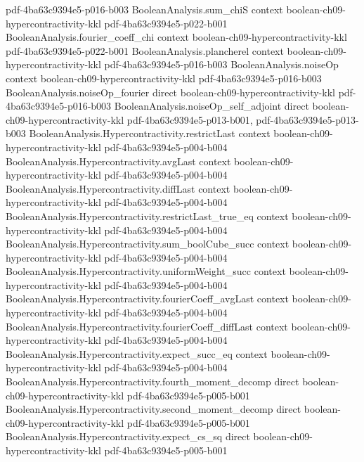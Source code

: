 \begin{theorem}[The $(4/3,2)$-hypercontractive inequality at $\rho=1/\sqrt3$]
  {pdf-4ba63c9394e5-p016-b003}
\proofstep
  {BooleanAnalysis.sum_chiS}
  {context}
  {boolean-ch09-hypercontractivity-kkl}
  {pdf-4ba63c9394e5-p022-b001}
\proofstep
  {BooleanAnalysis.fourier_coeff_chi}
  {context}
  {boolean-ch09-hypercontractivity-kkl}
  {pdf-4ba63c9394e5-p022-b001}
\proofstep
  {BooleanAnalysis.plancherel}
  {context}
  {boolean-ch09-hypercontractivity-kkl}
  {pdf-4ba63c9394e5-p016-b003}
\proofstep
  {BooleanAnalysis.noiseOp}
  {context}
  {boolean-ch09-hypercontractivity-kkl}
  {pdf-4ba63c9394e5-p016-b003}
\proofstep
  {BooleanAnalysis.noiseOp_fourier}
  {direct}
  {boolean-ch09-hypercontractivity-kkl}
  {pdf-4ba63c9394e5-p016-b003}
\proofstep
  {BooleanAnalysis.noiseOp_self_adjoint}
  {direct}
  {boolean-ch09-hypercontractivity-kkl}
  {pdf-4ba63c9394e5-p013-b001,
    pdf-4ba63c9394e5-p013-b003}
\proofstep
  {BooleanAnalysis.Hypercontractivity.restrictLast}
  {context}
  {boolean-ch09-hypercontractivity-kkl}
  {pdf-4ba63c9394e5-p004-b004}
\proofstep
  {BooleanAnalysis.Hypercontractivity.avgLast}
  {context}
  {boolean-ch09-hypercontractivity-kkl}
  {pdf-4ba63c9394e5-p004-b004}
\proofstep
  {BooleanAnalysis.Hypercontractivity.diffLast}
  {context}
  {boolean-ch09-hypercontractivity-kkl}
  {pdf-4ba63c9394e5-p004-b004}
\proofstep
  {BooleanAnalysis.Hypercontractivity.restrictLast_true_eq}
  {context}
  {boolean-ch09-hypercontractivity-kkl}
  {pdf-4ba63c9394e5-p004-b004}
\proofstep
  {BooleanAnalysis.Hypercontractivity.sum_boolCube_succ}
  {context}
  {boolean-ch09-hypercontractivity-kkl}
  {pdf-4ba63c9394e5-p004-b004}
\proofstep
  {BooleanAnalysis.Hypercontractivity.uniformWeight_succ}
  {context}
  {boolean-ch09-hypercontractivity-kkl}
  {pdf-4ba63c9394e5-p004-b004}
\proofstep
  {BooleanAnalysis.Hypercontractivity.fourierCoeff_avgLast}
  {context}
  {boolean-ch09-hypercontractivity-kkl}
  {pdf-4ba63c9394e5-p004-b004}
\proofstep
  {BooleanAnalysis.Hypercontractivity.fourierCoeff_diffLast}
  {context}
  {boolean-ch09-hypercontractivity-kkl}
  {pdf-4ba63c9394e5-p004-b004}
\proofstep
  {BooleanAnalysis.Hypercontractivity.expect_succ_eq}
  {context}
  {boolean-ch09-hypercontractivity-kkl}
  {pdf-4ba63c9394e5-p004-b004}
\proofstep
  {BooleanAnalysis.Hypercontractivity.fourth_moment_decomp}
  {direct}
  {boolean-ch09-hypercontractivity-kkl}
  {pdf-4ba63c9394e5-p005-b001}
\proofstep
  {BooleanAnalysis.Hypercontractivity.second_moment_decomp}
  {direct}
  {boolean-ch09-hypercontractivity-kkl}
  {pdf-4ba63c9394e5-p005-b001}
\proofstep
  {BooleanAnalysis.Hypercontractivity.expect_cs_sq}
  {direct}
  {boolean-ch09-hypercontractivity-kkl}
  {pdf-4ba63c9394e5-p005-b001}

\end{theorem}
